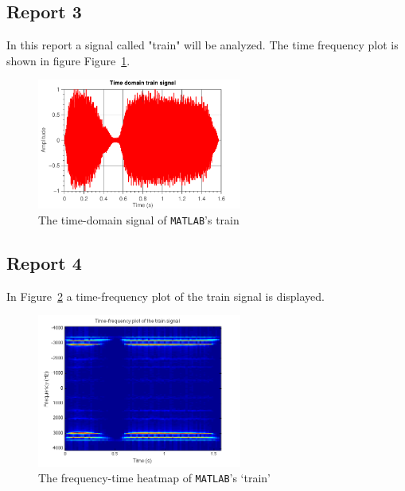 \documentclass[11pt,titlepage]{report}
\begin{document}
\subsection{Report 3}
In this report a signal called "train" will be analyzed. The time frequency plot is shown in figure Figure~\ref{fig:rep3-train-time}. 


\begin{figure}[H]
	\centering
	\includegraphics[width=0.6\textwidth]{../../deliverable-7-resources/figures/ass-1/report-3/ass-1-report-3.pdf}
	\caption{The time-domain signal of \texttt{MATLAB}'s train}
	\label{fig:rep3-train-time}
\end{figure}



\subsection{Report 4}
In Figure~\ref{fig:rep4-train-heatmap} a time-frequency plot of the train signal is displayed.

\begin{figure}[H]
	\centering
	\includegraphics[width=0.6\textwidth]{../../deliverable-7-resources/figures/ass-1/report-4/ass-1-report-4.png}
	\caption{The frequency-time heatmap of \texttt{MATLAB}'s `train'}
	\label{fig:rep4-train-heatmap}
\end{figure}
\end{document}
